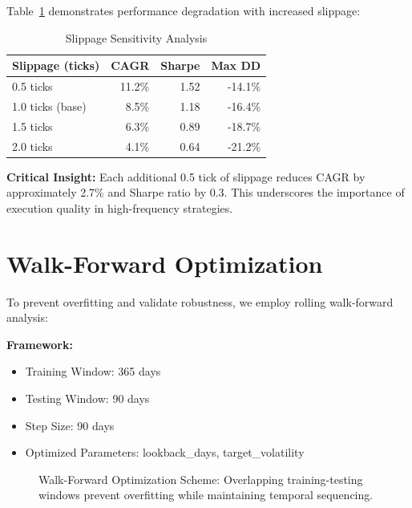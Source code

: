 \documentclass[twocolumn,ieee]{arithmaxresearch}
\begin{document}
Table~\ref{tab:cost_sensitivity} demonstrates performance degradation with increased slippage:

\begin{table}[h]
\centering
\caption{Slippage Sensitivity Analysis}
\label{tab:cost_sensitivity}
\begin{tabular}{@{}lrrr@{}}
\toprule
\textbf{Slippage (ticks)} & \textbf{CAGR} & \textbf{Sharpe} & \textbf{Max DD} \\
\midrule
0.5 ticks & 11.2\% & 1.52 & -14.1\% \\
1.0 ticks (base) & 8.5\% & 1.18 & -16.4\% \\
1.5 ticks & 6.3\% & 0.89 & -18.7\% \\
2.0 ticks & 4.1\% & 0.64 & -21.2\% \\
\bottomrule
\end{tabular}
\end{table}

\textbf{Critical Insight:} Each additional 0.5 tick of slippage reduces CAGR by approximately 2.7\% and Sharpe ratio by 0.3. This underscores the importance of execution quality in high-frequency strategies.

\section{Walk-Forward Optimization}

To prevent overfitting and validate robustness, we employ rolling walk-forward analysis:

\textbf{Framework:}
\begin{itemize}
    \item Training Window: 365 days
    \item Testing Window: 90 days
    \item Step Size: 90 days
    \item Optimized Parameters: lookback\_days, target\_volatility
\end{itemize}

\begin{figure}[h]
\centering
{}
\caption{Walk-Forward Optimization Scheme: Overlapping training-testing windows prevent overfitting while maintaining temporal sequencing.}
\label{fig:walk_forward}
\end{figure}
\end{document}
